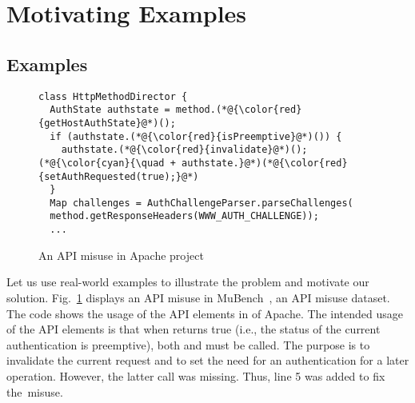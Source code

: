 \section{Motivating Examples}
\label{sec:motiv}

\subsection{Examples}

\begin{figure}[t]
	\centering
\begin{lstlisting}[]
class HttpMethodDirector {
  AuthState authstate = method.(*@{\color{red}{getHostAuthState}@*)();
  if (authstate.(*@{\color{red}{isPreemptive}@*)()) {
    authstate.(*@{\color{red}{invalidate}@*)();
(*@{\color{cyan}{\quad + authstate.}@*)(*@{\color{red}{setAuthRequested(true);}@*)
  }
  Map challenges = AuthChallengeParser.parseChallenges(
  method.getResponseHeaders(WWW_AUTH_CHALLENGE));
  ...
\end{lstlisting}
        \vspace{-12pt}
        \caption{An API misuse in Apache  project}
        \vspace{-6pt}
        \label{fig:example1}
\end{figure}

Let us use real-world examples to illustrate the problem and motivate
our solution. Fig.~\ref{fig:example1} displays an API misuse in
MuBench~\cite{mudetect-msr19}, an API misuse dataset. The code shows
the usage of the API elements in  of Apache.  The
intended usage of the API elements is that when
 returns true (i.e., the
status of the current authentication is preemptive), both
 and
 must be called. The
purpose is to invalidate the current request and to set the need for
an authentication for a later operation. However, the latter call was
missing. Thus, line 5 was added to fix the~misuse.

